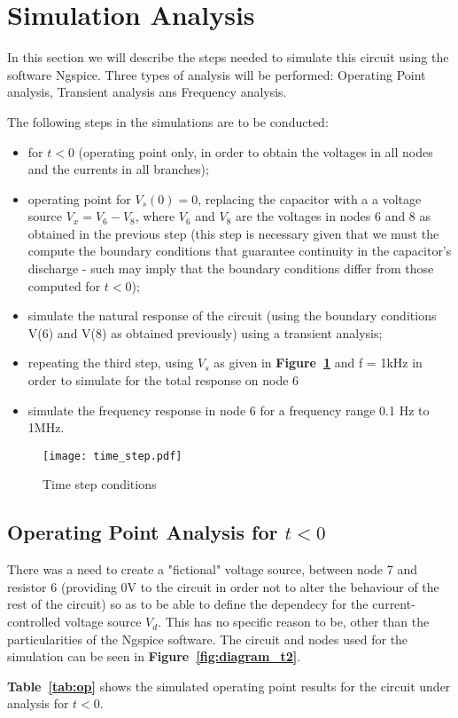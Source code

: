 \section{Simulation Analysis}
\label{sec:simulation}
In this section we will describe the steps needed to simulate this circuit using the software Ngspice. Three types of analysis will be performed: Operating Point analysis, Transient analysis ans Frequency analysis.

The following steps in the simulations are to be conducted: 
\begin{itemize}
	\item for $t<0$ (operating point only, in order to obtain the voltages in all nodes and the currents in all branches);
	\item operating point for  $V_s(0) = 0$, replacing the capacitor with a a voltage source $V_x = V_6-V_8$, where $V_6$ and $V_8$ are the voltages in nodes 6 and 8 as obtained in the previous step (this step is necessary given that we must the compute the boundary conditions that guarantee continuity in the capacitor's discharge - such may imply that the boundary conditions differ from those computed for $t<0$);
	\item simulate the natural response of the circuit (using the boundary conditions V(6) and V(8) as obtained previously) using a transient analysis;
	\item repeating the third step, using {\it $V_s$} as given in \textbf{Figure~\ref{fig:time_step}} and f = 1kHz  in order to simulate for the total response on node 6
	\item simulate the frequency response in node 6 for a frequency range 0.1 Hz to 1MHz.
\end{itemize}
 
 \begin{figure}[H] \centering
\texttt{[image: time\_step.pdf]}
\caption{Time step conditions}
\label{fig:time_step}
\end{figure}

\subsection{Operating Point Analysis for $t<0$}
There was a need to create a "fictional" voltage source, between node 7 and resistor 6 (providing 0V to the circuit in order not to alter the behaviour of the rest of the circuit) so as to be able to define the dependecy for the current-controlled voltage source {\it $V_d$}. This has no specific reason to be, other than the particularities of the Ngspice software. The circuit and nodes used for the simulation can be seen in \textbf{Figure~\ref{fig:diagram_t2}}.\par 
\textbf{Table~\ref{tab:op}} shows the simulated operating point results for the circuit
under analysis for $t<0$. 

